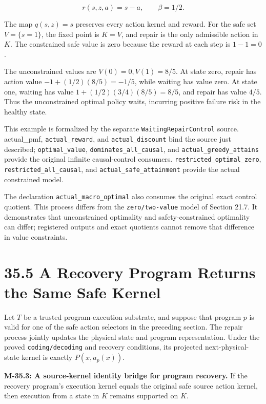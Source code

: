 \documentclass[
  english,
  11pt,
  oneside]{book}
\begin{document}
\[r(s,z,a)=s-a,\qquad\beta=1/2.\]

The map \(q(s,z)=s\) preserves every action kernel and reward. For the safe set \(V=\{s=1\}\), the fixed point is \(K=V\), and repair is the only admissible action in \(K\). The constrained safe value is zero because the reward at each step is \(1-1=0\).

The unconstrained values are \(V(0)=0,V(1)=8/5\). At state zero, repair has action value \(-1+(1/2)(8/5)=-1/5\), while waiting has value zero. At state one, waiting has value \(1+(1/2)(3/4)(8/5)=8/5\), and repair has value \(4/5\). Thus the unconstrained optimal policy waits, incurring positive failure risk in the healthy state.

This example is formalized by the separate \nolinkurl{WaitingRepairControl} source. actual\_pmf, \nolinkurl{actual_reward}, and \nolinkurl{actual_discount} bind the source just described; \nolinkurl{optimal_value}, \nolinkurl{dominates_all_causal}, and \nolinkurl{actual_greedy_attains} provide the original infinite causal-control consumers. \nolinkurl{restricted_optimal_zero}, \nolinkurl{restricted_all_causal}, and \nolinkurl{actual_safe_attainment} provide the actual constrained model.

The declaration \nolinkurl{actual_macro_optimal} also consumes the original exact control quotient. This process differs from the \nolinkurl{zero/two-value} model of Section 21.7. It demonstrates that unconstrained optimality and safety-constrained optimality can differ; registered outputs and exact quotients cannot remove that difference in value constraints.

\section{35.5 A Recovery Program Returns the Same Safe Kernel}\label{a-recovery-program-returns-the-same-safe-kernel}

Let \(T\) be a trusted program-execution substrate, and suppose that program \(p\) is valid for one of the safe action selectors in the preceding section. The repair process jointly updates the physical state and program representation. Under the proved \nolinkurl{coding/decoding} and recovery conditions, its projected next-physical-state kernel is exactly \(P(x,a_p(x))\).

\hypertarget{m-35-3}{}\label{m-35-3}

\textbf{M-35.3: A source-kernel identity bridge for program recovery.} If the recovery program's execution kernel equals the original safe source action kernel, then execution from a state in \(K\) remains supported on \(K\).
\end{document}
